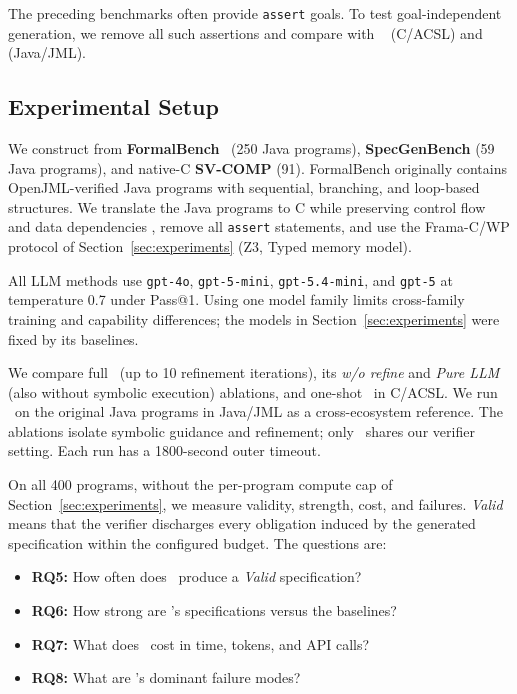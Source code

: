 \label{sec:large-scale-experiment}
The preceding benchmarks often provide \texttt{assert} goals. To test
goal-independent generation, we remove all such assertions and compare with
\autospec~\cite{autospec} (C/ACSL) and \specgen~\cite{SpecGen} (Java/JML).

\subsection{Experimental Setup}
We construct \textbf{} from \textbf{FormalBench}~\cite{le2025can}
(250 Java programs), \textbf{SpecGenBench} (59 Java programs), and native-C
\textbf{SV-COMP} (91). FormalBench originally contains OpenJML-verified Java
programs with sequential, branching, and loop-based structures. We translate
the Java programs to C while preserving
control flow and data dependencies ,
remove all \texttt{assert} statements, and use the Frama-C/WP protocol of
Section~\ref{sec:experiments} (Z3, Typed memory model).

All LLM methods use \texttt{gpt-4o}, \texttt{gpt-5-mini},
\texttt{gpt-5.4-mini}, and \texttt{gpt-5} at temperature 0.7 under Pass@1.
Using one model family limits cross-family training and capability differences;
the models in Section~\ref{sec:experiments} were fixed by its baselines.

We compare full \toolname\ (up to 10 refinement iterations), its \emph{w/o
refine} and \emph{Pure LLM} (also without symbolic execution) ablations, and
one-shot \autospec\ in C/ACSL. We run \specgen\ on the original Java programs
in Java/JML as a cross-ecosystem reference. The ablations isolate symbolic
guidance and refinement; only \autospec\ shares our verifier setting. Each
run has a 1800-second outer timeout.

On all 400 programs, without the per-program compute cap of
Section~\ref{sec:experiments}, we measure validity, strength, cost, and failures.
\emph{Valid} means that the verifier discharges every obligation induced by the
generated specification within the configured budget. The questions are:
\begin{itemize}
    \item \textbf{RQ5:} How often does \toolname\ produce a
    \emph{Valid} specification?
    \item \textbf{RQ6:} How strong are \toolname's specifications
    versus the baselines?
    \item \textbf{RQ7:} What does \toolname\ cost in time, tokens, and
    API calls?
    \item \textbf{RQ8:} What are \toolname's dominant failure modes?
\end{itemize}






